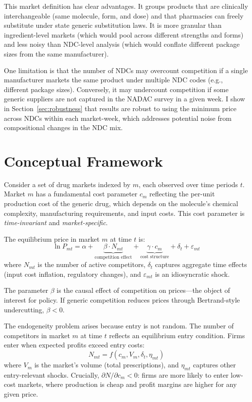 \documentclass[12pt]{article}
\begin{document}
This market definition has clear advantages. It groups products that are clinically interchangeable (same molecule, form, and dose) and that pharmacies can freely substitute under state generic substitution laws. It is more granular than ingredient-level markets (which would pool across different strengths and forms) and less noisy than NDC-level analysis (which would conflate different package sizes from the same manufacturer).

One limitation is that the number of NDCs may overcount competition if a single manufacturer markets the same product under multiple NDC codes (e.g., different package sizes). Conversely, it may undercount competition if some generic suppliers are not captured in the NADAC survey in a given week. I show in Section~\ref{sec:robustness} that results are robust to using the minimum price across NDCs within each market-week, which addresses potential noise from compositional changes in the NDC mix.


\section{Conceptual Framework}\label{sec:framework}

Consider a set of drug markets indexed by $m$, each observed over time periods $t$. Market $m$ has a fundamental cost parameter $c_m$ reflecting the per-unit production cost of the generic drug, which depends on the molecule's chemical complexity, manufacturing requirements, and input costs. This cost parameter is \emph{time-invariant} and \emph{market-specific}.

The equilibrium price in market $m$ at time $t$ is:
\begin{equation}\label{eq:price}
\ln P_{mt} = \alpha + \underbrace{\beta \cdot N_{mt}}_{\text{competition effect}} + \underbrace{\gamma \cdot c_m}_{\text{cost structure}} + \delta_t + \varepsilon_{mt}
\end{equation}
where $N_{mt}$ is the number of active competitors, $\delta_t$ captures aggregate time effects (input cost inflation, regulatory changes), and $\varepsilon_{mt}$ is an idiosyncratic shock.

The parameter $\beta$ is the causal effect of competition on prices---the object of interest for policy. If generic competition reduces prices through Bertrand-style undercutting, $\beta < 0$.

The endogeneity problem arises because entry is not random. The number of competitors in market $m$ at time $t$ reflects an equilibrium entry condition. Firms enter when expected profits exceed entry costs:
\begin{equation}\label{eq:entry}
N_{mt} = f(c_m, V_m, \delta_t, \eta_{mt})
\end{equation}
where $V_m$ is the market's volume (total prescriptions), and $\eta_{mt}$ captures other entry-relevant shocks. Crucially, $\partial N / \partial c_m < 0$: firms are more likely to enter low-cost markets, where production is cheap and profit margins are higher for any given price.
\end{document}
